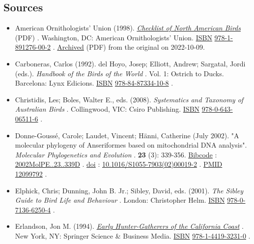 \documentclass[11pt,a4paper]{article}
\begin{document}
\subsection{Sources}

\begin{itemize}
\item American Ornithologists' Union (1998). \href{https://americanornithology.org/wp-content/uploads/2019/07/AOSChecklistTin-Falcon.pdf}{\textit{Checklist of North American Birds}} (PDF) . Washington, DC: American Ornithologists' Union. \href{/wiki/ISBN\_(identifier)}{ISBN} \href{/wiki/Special:BookSources/978-1-891276-00-2}{978-1-891276-00-2} . \href{https://ghostarchive.org/archive/20221009/https://americanornithology.org/wp-content/uploads/2019/07/AOSChecklistTin-Falcon.pdf}{Archived} (PDF) from the original on 2022-10-09.
\item Carboneras, Carlos (1992). del Hoyo, Josep; Elliott, Andrew; Sargatal, Jordi (eds.). \textit{Handbook of the Birds of the World} . Vol. 1: Ostrich to Ducks. Barcelona: Lynx Edicions. \href{/wiki/ISBN\_(identifier)}{ISBN} \href{/wiki/Special:BookSources/978-84-87334-10-8}{978-84-87334-10-8} .
\item Christidis, Les; Boles, Walter E., eds. (2008). \textit{Systematics and Taxonomy of Australian Birds} . Collingwood, VIC: Csiro Publishing. \href{/wiki/ISBN\_(identifier)}{ISBN} \href{/wiki/Special:BookSources/978-0-643-06511-6}{978-0-643-06511-6} .
\item Donne-Goussé, Carole; Laudet, Vincent; Hänni, Catherine (July 2002). "A molecular phylogeny of Anseriformes based on mitochondrial DNA analysis". \textit{Molecular Phylogenetics and Evolution} . \textbf{23} (3): 339-356. \href{/wiki/Bibcode\_(identifier)}{Bibcode} : \href{https://ui.adsabs.harvard.edu/abs/2002MolPE..23..339D}{2002MolPE..23..339D} . \href{/wiki/Doi\_(identifier)}{doi} : \href{https://doi.org/10.1016\%2FS1055-7903\%2802\%2900019-2}{10.1016/S1055-7903(02)00019-2} . \href{/wiki/PMID\_(identifier)}{PMID} \href{https://pubmed.ncbi.nlm.nih.gov/12099792}{12099792} .
\item Elphick, Chris; Dunning, John B. Jr.; Sibley, David, eds. (2001). \textit{The Sibley Guide to Bird Life and Behaviour} . London: Christopher Helm. \href{/wiki/ISBN\_(identifier)}{ISBN} \href{/wiki/Special:BookSources/978-0-7136-6250-4}{978-0-7136-6250-4} .
\item Erlandson, Jon M. (1994). \href{https://books.google.com/books?id=nGTaBwAAQBAJ\&pg=171}{\textit{Early Hunter-Gatherers of the California Coast}} . New York, NY: Springer Science \& Business Media. \href{/wiki/ISBN\_(identifier)}{ISBN} \href{/wiki/Special:BookSources/978-1-4419-3231-0}{978-1-4419-3231-0} .

\end{itemize}
\end{document}
